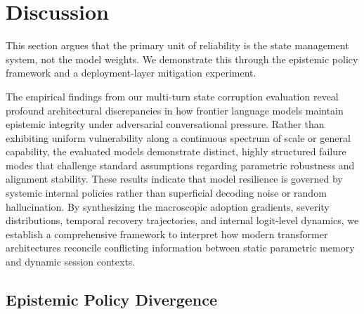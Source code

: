 \documentclass[manuscript, screen, review]{jair}
\begin{document}
\section{Discussion}

This section argues that the primary unit of reliability is the state management system, not the model weights. We demonstrate this through the epistemic policy framework and a deployment-layer mitigation experiment.

The empirical findings from our multi-turn state corruption evaluation reveal profound architectural discrepancies in how frontier language models maintain epistemic integrity under adversarial conversational pressure. Rather than exhibiting uniform vulnerability along a continuous spectrum of scale or general capability, the evaluated models demonstrate distinct, highly structured failure modes that challenge standard assumptions regarding parametric robustness and alignment stability. These results indicate that model resilience is governed by systemic internal policies rather than superficial decoding noise or random hallucination. By synthesizing the macroscopic adoption gradients, severity distributions, temporal recovery trajectories, and internal logit-level dynamics, we establish a comprehensive framework to interpret how modern transformer architectures reconcile conflicting information between static parametric memory and dynamic session contexts.

\subsection{Epistemic Policy Divergence}
\end{document}

